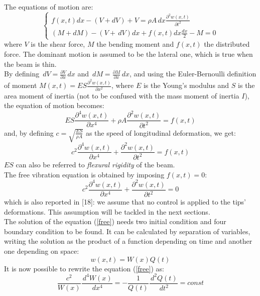 \documentclass[a4paper,12pt,oneside]{report}
\begin{document}
The equations of motion are:
\begin{equation}
\begin{cases}
f(x,t)dx-(V+dV)+V=\rho A \,dx \frac{\partial^2w(x,t)}{\partial t^2}\\
(M+dM)-(V+\,dV)dx+f(x,t)dx\frac{dx}{2}-M=0
\end{cases}
\end{equation}
where $V$ is the shear force, $M$ the bending moment and $f(x,t)$ the distributed force. The dominant motion is assumed to be the lateral one, which is true when the beam is thin.\\
By defining $\,dV=\frac{\partial V}{\partial x}\,dx$ and $\,dM=\frac{\partial M}{\partial x}\,dx$, and using the Euler-Bernoulli definition of moment $M(x,t)=ES\frac{\partial^2 w(x,t)}{\partial x^2}$, where $E$ is the Young's modulus and $S$ is the area moment of inertia (not to be confused with the mass moment of inertia $I$), the equation of motion becomes:
\begin{equation}
  ES\frac{\partial^4w(x,t)}{\partial x^4}+\rho A\frac{\partial^2w(x,t)}{\partial t^2}=f(x,t)
\end{equation}
and, by defining $c=\sqrt{\frac{ES}{\rho A}}$ as the speed of longitudinal deformation, we get:
\begin{equation}
c^2\frac{\partial^4w(x,t)}{\partial x^4}+\frac{\partial^2w(x,t)}{\partial t^2}=f(x,t)
\label{forced}
\end{equation}
$ES$ can also be referred to \textit{flexural rigidity} of the beam.\\
The free vibration equation is obtained by imposing $f(x,t)=0$:\\
 \begin{equation}
c^2\frac{\partial^4w(x,t)}{\partial x^4}+\frac{\partial^2w(x,t)}{\partial t^2}=0
\label{free}
\end{equation}
which is also reported in [18]: we assume that no control is applied to the tips' deformations. This assumption will be tackled in the next sections.\\
The solution of the equation (\ref{free}) needs two initial condition and four boundary condition to be found. It can be calculated by separation of variables, writing the solution as the product of a function depending on time and another one depending on space:
\begin{equation}
w(x,t)=W(x)Q(t)
\label{separability}
\end{equation}
It is now possible to rewrite the equation (\ref{free}) as:
\begin{equation}
\frac{c^2}{W(x)}\frac{\,d^4W(x)}{\,dx^4}=-\frac{1}{Q(t)}\frac{\,d^2Q(t)}{\,dt^2}=const
\end{equation}
\end{document}
